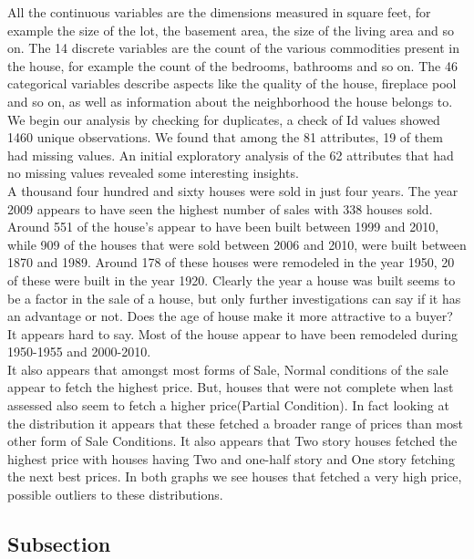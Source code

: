 \documentclass[fleqn,10pt]{SelfArx} %
\begin{document}
	All the continuous variables are the dimensions measured in square feet, for example the size of the lot, the basement area, the size of the living area and so on. The 14 discrete variables are the count of the various commodities present in the house, for example the count of the bedrooms, bathrooms and so on. The 46 categorical variables describe aspects like the quality of the house, fireplace pool and so on, as well as information about the neighborhood the house belongs to. \\
	
	We begin our analysis by checking for duplicates, a check of Id values showed 1460 unique observations. We found that among the 81 attributes, 19 of them had missing values. An initial exploratory analysis of the 62 attributes that had no missing values revealed some interesting insights. \\
	
	A thousand four hundred and sixty houses were sold in just four years. The year 2009 appears to have seen the highest number of sales with 338 houses sold. Around 551 of the house's appear to have been built between 1999 and 2010, while 909 of the houses that were sold between 2006 and 2010,  were built between 1870 and 1989. Around 178 of these houses were remodeled in the year 1950, 20 of these were built in the year 1920. Clearly the year a house was built seems to be a factor in the sale of a house, but only further investigations can say if it has an advantage or not. Does the age of house make it more attractive to a buyer? It appears hard to say. Most of the house appear to have been remodeled during 1950-1955 and 2000-2010. \\
	
	It also appears that amongst most forms of Sale, Normal conditions of the sale appear to fetch the highest price. But, houses that were not complete when last assessed also seem to fetch a higher price(Partial Condition). In fact looking at the distribution it appears that these fetched a broader range of prices than most other form of Sale Conditions. It also appears that Two story houses fetched the highest price with houses having Two and one-half story and One story fetching the next best prices. In both graphs we see houses that fetched a very high price, possible outliers to these distributions. 
	
	\subsection{Subsection}
	
\end{document}
